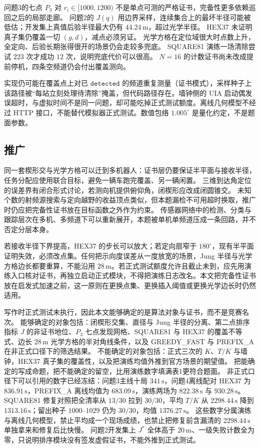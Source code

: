 问题3的七点 $P_3$ 对 $r_i\in[1000,1200)$ 不是单点可测的严格证书，完备性更多依赖巡回之后的局部走廊。
问题2的 $J(q)$ 用边界采样，连续集合上的最坏半径可能被低估；开发集上真值后验半径最大仍有 $44.24\,\mathrm{m}$，超过光学半径。
HEX37 未证明真子集仍覆盖一切 $(g,d)$，减点必须另证。
光学方格在定位域很大时点数上升，全定向、后验长期张得很开的场景仍会走较多兜底。
SQUARE81 演练一场清除尝试 $223$ 次才成功 $12$ 次，说明兜底代价可以很高。
$N=16$ 的计数证书尚未改成提前停机，四条空频道仍会付出覆盖测向。

实现仍可能在覆盖点上对已 $\mathtt{detected}$ 的频道重复测量（证书模式），采样种子上该路径被“每站立刻处理待清除”掩盖，但代码路径存在。墙钟侧的 UIA 启动偶发误超时，与虚拟时间不是同一问题，却可能吃掉正式测试额度。离线几何模型不经过 HTTP 接口，不能替代模拟器正式测试。数值包络 $1.005^\circ$ 是量化约定，不是题面参数。

\subsection{推广}

同一套楔形交与光学方格可以迁到多机器人：证书层仍要保证半平面与接收半径，任务分配应使用联合目标，避免一辆车跑完覆盖、另一辆闲置。
三维到达角定位的误差界有闭合形式讨论，若测向机提供俯仰角，闭楔形应改成闭圆锥交。
未知个数的射频源搜索与定向越野的收益顶点类似，但本题漏检不可用超时换取，推广时仍应把完备性证书放在目标函数之外作为约束。
传感器网络中的检测、分类与跟踪层次在多机、多频道下可以重新展开，本题被单机单频道压成一条回路，并不否定分层本身。

若接收半径下界提高，HEX37 的步长可以放大；若定向扇窄于 $180^\circ$，现有半平面证明失效，必须改点集。任何把示向度误差从一度放宽的场景，Jung 半径与光学方格边长都要重算，不能沿用 $28\,\mathrm{m}$。若正式测试额度允许且截止未到，应先用演练入口核对证书，再独立启动正式模块，不得把演练日志改名。本文把完备性证书放在启发式加速之前，这一原则在更换点集、更换插入阈值或更换光学边长时仍然适用。

写作时正式测试未执行，因此本文能够确定的是算法对象与证书，而不是竞赛名次。
能够确定的对象包括：闭楔形交集、直径与 Jung 半径的分离、第二点排序指标 $J$ 的非证书地位、$P_3$ 七点发现网格、SQUARE81 与 HEX37 的覆盖不等式、边长 $28\,\mathrm{m}$ 光学方格的半对角线条件，以及 GREEDY\_FAST 与 PREFIX\_A 在非正式口径下的筛选结果。
不能确定的对象包括：正式三次的 $K$、$T/K$ 与墙钟，HEX37 真子集的覆盖性，以及把演练均值外推到官方场景的期望值。
把能确定的写成命题，把不能确定的留空，比用演练数字填满表1更符合题面。
非正式口径下可以引用的数字已经冻结：问题3主线十局 $341\,\mathrm{s}$，问题4离线配对 HEX37 为 $836.91\,\mathrm{s}$，PREFIX\_A 离线均值为 $683.09\,\mathrm{s}$，演练两场为 $822.38\,\mathrm{s}$ 与 $930.28\,\mathrm{s}$。
SQUARE81 修复对照把全清率从 $13/30$ 拉到 $30/30$，平均 $T/K$ 从 $2298.44\,\mathrm{s}$ 降到 $1313.16\,\mathrm{s}$；留出种子 $1000$--$1029$ 仍为 $30/30$，均值 $1376.27\,\mathrm{s}$。
这些数字分属演练与离线几何模型，禁止平均成一个现场成绩，也禁止把修复前含漏清的 $2298.44\,\mathrm{s}$ 单独拿来和修复后比快慢。
问题2开发集上 $J^\ast$ 全体高于 $20\,\mathrm{m}$、一级失败计数全为零，只说明排序模块没有签发虚假证书，不能外推到正式测试。

